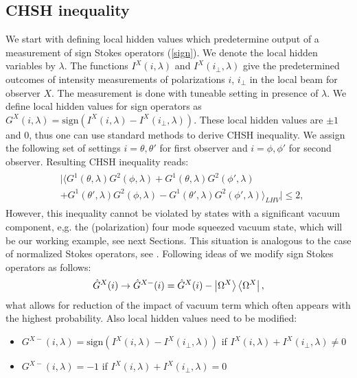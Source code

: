 \documentclass[aps,pra, twocolumn, showpacs]{revtex4-2}
\begin{document}
\subsection{CHSH inequality}\label{sectionchsh}
We start with defining local hidden values which predetermine output of a measurement of sign Stokes operators (\ref{sign}). 
We denote the local hidden variables by $\lambda$. The functions 
$I^X(i,\lambda)$ and $I^X(i_{\perp},\lambda)$
give the predetermined outcomes of intensity measurements of  polarizations $i$, $i_\perp$ in the local beam for observer $X$.
The measurement is done with tuneable setting in presence of $\lambda$.
We define local hidden values for sign operators as $G^X(i,\lambda)=\mathrm{sign}(I^X(i,\lambda)-I^X(i_\perp,\lambda))$. 
These local hidden values are $\pm1$ and $0$, thus one can use standard methods to derive CHSH inequality.
We assign the following set of settings $i = \theta,\theta'$ for first observer and $i= \phi, \phi'$ for second observer. 
Resulting CHSH inequality reads:  
\begin{align}
\begin{split} 
&|\langle G^{1}(\theta,\lambda) G^{2}(\phi,\lambda)+ G^{1}(\theta,\lambda) G^{2}(\phi',\lambda)\\
&+ G^{1}(\theta',\lambda) G^{2}(\phi,\lambda)- G^{1}(\theta',\lambda) G^{2}(\phi',\lambda)\rangle_{LHV}|\leq 2, \label{bsvin1}
\end{split}
\end{align}
However, this inequality cannot be violated by states with a significant vacuum component, e,g. the (polarization) four mode  squeezed vacuum state, which will be our working example, see next Sections. 
This situation is analogous to the case of normalized Stokes operators, see \cite{ZUKUBELL}. 
Following ideas of \cite{ZUKUBELL} we modify sign Stokes operators as follows:
\begin{equation}
\hat G^X(i)\rightarrow \hat G^{X-}(i)=\hat G^X(i)-\ket{\Omega^X}\bra{\Omega^X},
\end{equation}
what allows for reduction of  the impact of vacuum term which often appears with  the highest probability. 
Also local hidden values need to be modified:
\begin{itemize}
	\item{$G^{X-}(i,\lambda)=\mathrm{sign}(I^X(i,\lambda)-I^X(i_\perp,\lambda))$ if \newline $I^X(i,\lambda)+I^X(i_\perp,\lambda)\neq 0$
}
  \item{$G^{X-}(i,\lambda)=-1$ if $I^X(i,\lambda)+I^X(i_\perp,\lambda)=0$} 
\end{itemize}
\end{document}
